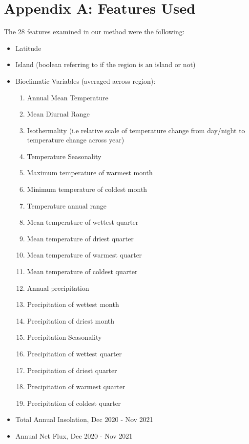 \documentclass[prl,showpacs,superscriptaddress,twocolumn,longbibliography]{revtex4-1}
\begin{document}



\onecolumngrid
\appendix

\section{Appendix A: Features Used} \label{appendix:raw}
The 28 features examined in our method were the following:
\begin{itemize}
\item Latitude
\item Island (boolean referring to if the region is an island or not)
\item Bioclimatic Variables (averaged across region)\cite{fick_worldclim_2017}:
\begin{enumerate}
	\item Annual Mean Temperature
	\item Mean Diurnal Range
	\item Isothermality (i.e relative scale of temperature change from day/night to temperature change across year)
	\item Temperature Seasonality
	\item Maximum temperature of warmest month
	\item Minimum temperature of coldest month
	\item Temperature annual range
	\item Mean temperature of wettest quarter
	\item Mean temperature of driest quarter
	\item Mean temperature of warmest quarter
	\item Mean temperature of coldest quarter
	\item Annual precipitation
	\item Precipitation of wettest month
	\item Precipitation of driest month
	\item Precipitation Seasonality
	\item Precipitation of wettest quarter
	\item Precipitation of driest quarter
	\item Precipitation of warmest quarter
	\item Precipitation of coldest quarter
\end{enumerate}
\item Total Annual Insolation, Dec 2020 - Nov 2021\cite{nasa_insol}
\item Annual Net Flux, Dec 2020 - Nov 2021\cite{nasa_netflux}

\end{itemize}
\end{document}
